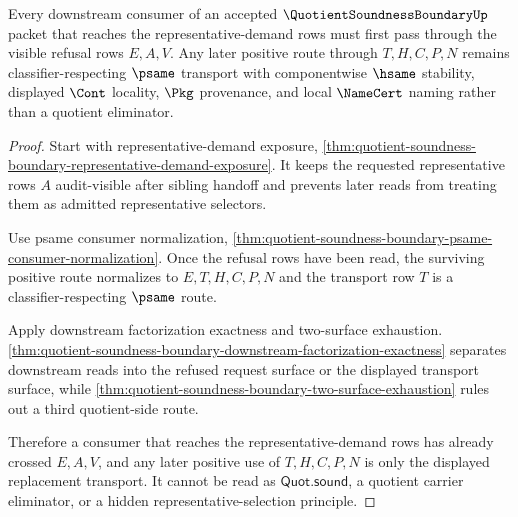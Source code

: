 \begin{theorem}
\label{thm:quotient-soundness-boundary-refusal-ledger-consumer-frontier}
Every downstream consumer of an accepted $\QuotientSoundnessBoundaryUp$ packet that reaches the representative-demand rows must first pass through the visible refusal rows $E,A,V$. Any later positive route through $T,H,C,P,N$ remains classifier-respecting $\psame$ transport with componentwise $\hsame$ stability, displayed $\Cont$ locality, $\Pkg$ provenance, and local $\NameCert$ naming rather than a quotient eliminator.
\end{theorem}
\begin{proof}
Start with representative-demand exposure, \autoref{thm:quotient-soundness-boundary-representative-demand-exposure}. It keeps the requested representative rows $A$ audit-visible after sibling handoff and prevents later reads from treating them as admitted representative selectors.

Use psame consumer normalization, \autoref{thm:quotient-soundness-boundary-psame-consumer-normalization}. Once the refusal rows have been read, the surviving positive route normalizes to $E,T,H,C,P,N$ and the transport row $T$ is a classifier-respecting $\psame$ route.

Apply downstream factorization exactness and two-surface exhaustion. \autoref{thm:quotient-soundness-boundary-downstream-factorization-exactness} separates downstream reads into the refused request surface or the displayed transport surface, while \autoref{thm:quotient-soundness-boundary-two-surface-exhaustion} rules out a third quotient-side route.

Therefore a consumer that reaches the representative-demand rows has already crossed $E,A,V$, and any later positive use of $T,H,C,P,N$ is only the displayed replacement transport. It cannot be read as $\mathsf{Quot.sound}$, a quotient carrier eliminator, or a hidden representative-selection principle.
\end{proof}


